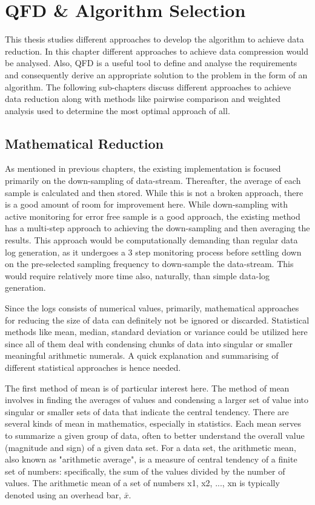 \section{QFD \& Algorithm Selection}\label{sec:Algorithm definition}

This thesis studies different approaches to develop the algorithm to achieve data reduction. In this chapter different approaches to achieve data compression would be analysed. Also, QFD is a useful tool to define and analyse the requirements and consequently derive an appropriate solution to the problem in the form of an algorithm. The following sub-chapters discuss different approaches to achieve data reduction along with methods like pairwise comparison and weighted analysis used to determine the most optimal approach of all.

\subsection{Mathematical Reduction}\label{sec:Mathematical reduction}
As mentioned in previous chapters, the existing implementation is focused primarily on the down-sampling of data-stream. Thereafter, the average of each sample is calculated and then stored. While this is not a broken approach, there is a good amount of room for improvement here. While down-sampling with active monitoring for error free sample is a good approach, the existing method has a multi-step approach to achieving the down-sampling and then averaging the results. This approach would be computationally demanding than regular data log generation, as it undergoes a 3 step monitoring process before settling down on the pre-selected sampling frequency to down-sample the data-stream. This would require relatively more time also, naturally, than simple data-log generation. 

Since the logs consists of numerical values, primarily, mathematical approaches for reducing the size of data can definitely not be ignored or discarded. Statistical methods like mean, median, standard deviation or variance could be utilized here since all of them deal with condensing chunks of data into singular or smaller meaningful arithmetic numerals. A quick explanation and summarising of different statistical approaches is hence needed. 

The first method of mean is of particular interest here. The method of mean involves in finding the averages of values and condensing a larger set of value into singular or smaller sets of data that indicate the central tendency. There are several kinds of mean in mathematics, especially in statistics. Each mean serves to summarize a given group of data, often to better understand the overall value (magnitude and sign) of a given data set. For a data set, the arithmetic mean, also known as "arithmetic average", is a measure of central tendency of a finite set of numbers: specifically, the sum of the values divided by the number of values. The arithmetic mean of a set of numbers x1, x2, ..., xn is typically denoted using an overhead bar, $\bar{x}$. \cite{mean} 

